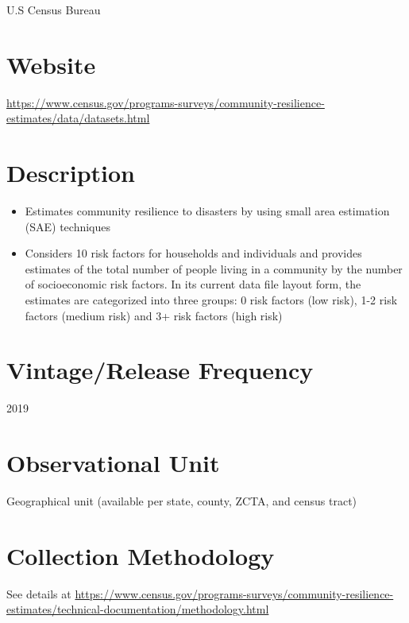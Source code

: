 \documentclass[
]{book}
\providecommand{\tightlist}{%
  \setlength{\itemsep}{0pt}\setlength{\parskip}{0pt}}
\begin{document}
U.S Census Bureau

\hypertarget{website-18}{%
\section{Website}\label{website-18}}

\url{https://www.census.gov/programs-surveys/community-resilience-estimates/data/datasets.html}

\hypertarget{description-18}{%
\section{Description}\label{description-18}}

\begin{itemize}
\tightlist
\item
  Estimates community resilience to disasters by using small area estimation (SAE) techniques
\item
  Considers 10 risk factors for households and individuals and provides estimates of the total number of people living in a community by the number of socioeconomic risk factors. In its current data file layout form, the estimates are categorized into three
  groups: 0 risk factors (low risk), 1-2 risk factors (medium risk) and 3+ risk factors (high risk)
\end{itemize}

\hypertarget{vintagerelease-frequency-18}{%
\section{Vintage/Release Frequency}\label{vintagerelease-frequency-18}}

2019

\hypertarget{observational-unit-18}{%
\section{Observational Unit}\label{observational-unit-18}}

Geographical unit (available per state, county, ZCTA, and census tract)

\hypertarget{collection-methodology-18}{%
\section{Collection Methodology}\label{collection-methodology-18}}

See details at \url{https://www.census.gov/programs-surveys/community-resilience-estimates/technical-documentation/methodology.html}
\end{document}
